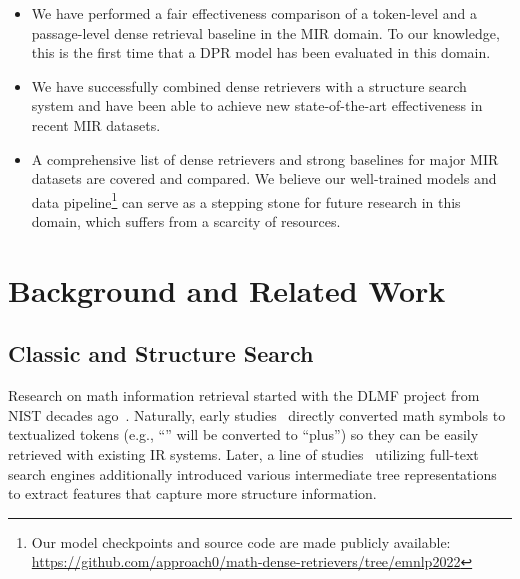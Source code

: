 \documentclass[11pt]{article}
\begin{document}
\begin{itemize}[leftmargin=*]
  \item We have performed a fair effectiveness comparison of a token-level and a passage-level dense retrieval baseline in the MIR domain. To our knowledge, this is the first time that a DPR model has been evaluated in this domain.
  
  \item We have successfully combined dense retrievers with a structure search system and have been able to achieve new state-of-the-art effectiveness in recent MIR datasets.

  \item A comprehensive list of dense retrievers and strong baselines for major MIR datasets are covered and compared. We believe our well-trained models and data pipeline\footnote{Our model checkpoints and source code are made publicly available: \url{https://github.com/approach0/math-dense-retrievers/tree/emnlp2022}} can serve as a stepping stone for future research in this domain, which suffers from a scarcity of resources.
  
\end{itemize}

\section{Background and Related Work}

\subsection{Classic and Structure Search}

Research on math information retrieval started with the DLMF project from NIST decades ago~\cite{miller2003technical}.
Naturally, early studies~\cite{miller2003technical,youssef2005issue_and_methods} directly converted math symbols to textualized tokens (e.g., ``'' will be converted to ``plus'') so they can be easily retrieved with existing IR systems.
Later, a line of studies~\cite{hijikata2009search,sojka2011art,lin2014mathematics,zanibbi2015tangent,kristianto2016mcat,fraser2018tangentL} utilizing full-text search engines additionally introduced various intermediate tree representations to extract features that capture more structure information.
\end{document}

